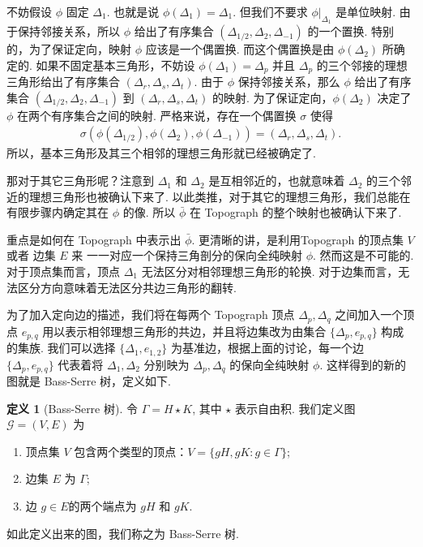 \documentclass[10pt,UTF8]{ctexart}
\theoremstyle{definition}
\newtheorem{definition}[theorem]{定义}
\theoremstyle{remark}
\begin{document}
不妨假设 $\phi$ 固定 $\Delta_1$. 也就是说 $\phi(\Delta_1) = \Delta_1. $ 但我们不要求 $\phi|_{\Delta_1}$ 是单位映射. 
由于保持邻接关系，所以 $\phi$ 给出了有序集合 $(\Delta_{1/2},\Delta_{2},\Delta_{-1})$ 的一个置换. 特别的，为了保证定向，映射 $\phi$ 应该是一个偶置换. 
而这个偶置换是由 $\phi(\Delta_2)$ 所确定的. 如果不固定基本三角形，不妨设 $\phi(\Delta_1)=\Delta_p$ 并且 $\Delta_p$ 的三个邻接的理想三角形给出了有序集合 $(\Delta_r,\Delta_s,\Delta_t)$.
由于 $\phi$ 保持邻接关系，那么 $\phi$ 给出了有序集合 $(\Delta_{1/2},\Delta_{2},\Delta_{-1})$  到 $(\Delta_r,\Delta_s,\Delta_t)$ 的映射. 为了保证定向，$\phi(\Delta_2)$ 决定了 $\phi$ 在两个有序集合之间的映射. 
严格来说，存在一个偶置换 $\sigma$ 使得 
\begin{align*}
    \sigma(\phi(\Delta_{1/2}),\phi(\Delta_{2}),\phi(\Delta_{-1})) = (\Delta_r,\Delta_s,\Delta_t). 
\end{align*} 
所以，基本三角形及其三个相邻的理想三角形就已经被确定了. 



那对于其它三角形呢？注意到 $\Delta_1$ 和 $\Delta_2$ 是互相邻近的，也就意味着 $\Delta_2$ 的三个邻近的理想三角形也被确认下来了. 
以此类推，对于其它的理想三角形，我们总能在有限步骤内确定其在 $\phi$ 的像. 所以 $\bar{\phi}$ 在 Topograph 的整个映射也被确认下来了. 



重点是如何在 Topograph 中表示出 $\bar{\phi}$. 更清晰的讲，是利用Topograph 的顶点集 $V$ 或者 边集 $E$ 来 一一对应一个保持三角剖分的保向全纯映射 $\phi$.
然而这是不可能的. 对于顶点集而言，顶点 $\Delta_1$ 无法区分对相邻理想三角形的轮换. 对于边集而言，无法区分方向意味着无法区分共边三角形的翻转. 

为了加入定向边的描述，我们将在每两个 Topograph 顶点 $\Delta_p,\Delta_q$ 之间加入一个顶点 $e_{p,q}$ 用以表示相邻理想三角形的共边，并且将边集改为由集合 $\{\Delta_p,e_{p,q}\}$ 构成的集族. 
我们可以选择 $\{\Delta_1,e_{1,2}\}$ 为基准边，根据上面的讨论，每一个边 $\{\Delta_p,e_{p,q}\}$ 代表着将 $\Delta_1,\Delta_2$ 分别映为 $\Delta_p,\Delta_q$ 的保向全纯映射 $\phi$.
这样得到的新的图就是 Bass-Serre 树，定义如下. 

\begin{definition}[Bass-Serre 树]
    令 $\Gamma = H \star K$, 其中 $\star$ 表示自由积. 我们定义图 $\mathcal{G} = (V,E)$ 为
    \begin{enumerate}
        \item 顶点集 $V$ 包含两个类型的顶点：$V=\{gH,gK: g \in\Gamma\}$;
        \item 边集 $E$ 为 $\Gamma$;
        \item 边 $g\in E$的两个端点为 $gH$ 和 $gK$.
    \end{enumerate}
    如此定义出来的图，我们称之为 Bass-Serre 树.
\end{definition}
\end{document}
